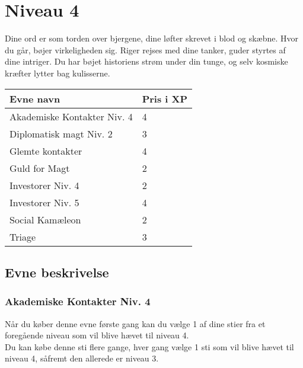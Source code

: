 \chapter*{Niveau 4}

Dine ord er som torden over bjergene, dine løfter skrevet i blod og skæbne. Hvor du går, bøjer virkeligheden sig. Riger rejses med dine tanker, guder styrtes af dine intriger. Du har bøjet historiens strøm under din tunge, og selv kosmiske kræfter lytter bag kulisserne.

\begin{table}[H]
    \centering
    \begin{tabular}{|p{}|p{}|}
    \rowcolor{cerulean!80}\hline
        Evne navn & Pris i XP \\\hline
         Akademiske Kontakter Niv. 4 &4 \\\hline
         Diplomatisk magt Niv. 2 & 3 \\\hline
         Glemte kontakter & 4 \\\hline
         Guld for Magt & 2 \\\hline
         Investorer Niv. 4 & 2 \\\hline
         Investorer Niv. 5 & 4 \\\hline
         Social Kamæleon & 2 \\\hline
         Triage & 3 \\\hline
    \end{tabular}
\end{table}
\section*{Evne beskrivelse}

\subsection*{Akademiske Kontakter Niv. 4}

Når du køber denne evne første gang kan du vælge 1 af dine stier fra et foregående niveau som vil blive hævet til niveau 4.\\
Du kan købe denne sti flere gange, hver gang vælge 1 sti som vil blive hævet til niveau 4, såfremt den allerede er niveau 3. \\

